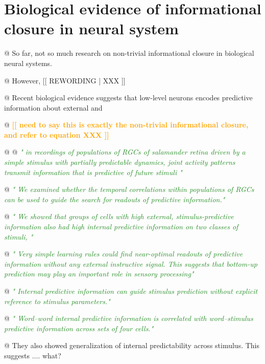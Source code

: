 \documentclass[utf8]{article}
\newenvironment{ants}
			{
			 \begin{easylist}[itemize]		
		 	}
			{
			\end{easylist}
			}
\newcommand{\rewrite}[1]{\textcolor{ForestGreen}{\textit{"#1"}}\newline}
\newcommand{\toWrite}[1]{\noindent
			\textcolor{Orange}{\textbf{[[ #1 ]]}}}
\newcommand{\rewording}[1]{\textcolor{RawSienna}{[[ REWORDING | #1 ]]}}
\begin{document}
	\section*{Biological evidence of informational closure in neural system}
		\begin{ants}		
			
			
			@ So far, not so much research on non-trivial informational closure in biological neural systems. 
			
			@ However, \rewording{XXX}
			
			@ Recent biological evidence suggests that low-level neurons encodes predictive information about external  and 
			
			@ \toWrite{
				need to say this is exactly the non-trivial informational closure, and refer to equation XXX}
			
			@ \cite{sederberg2018learning}
			@ \rewrite{
				in recordings of populations of RGCs of salamander retina driven by a simple stimulus with partially predictable dynamics, joint activity patterns transmit information that is predictive of future stimuli }
			
			@ \rewrite{
				We examined whether the temporal correlations within populations of RGCs can be used to guide the search for readouts of predictive information.}
			
			@ \rewrite{
				We showed that groups of cells with high external, stimulus-predictive information also had high internal predictive information on two classes of stimuli, }
			
			@ \rewrite{
				Very simple learning rules could find near-optimal readouts of predictive information without any external instructive signal. This suggests that bottom-up prediction may play an important role in sensory processing}
			
			@ \rewrite{
				Internal predictive information can guide stimulus prediction without explicit reference to stimulus parameters.}
			
			@ \rewrite{
				Word–word internal predictive information is correlated with word–stimulus predictive information across sets of four cells.}
			
			@ They also showed generalization of internal predictability across stimulus. This suggests .... what?
			

\end{ants}
\end{document}
